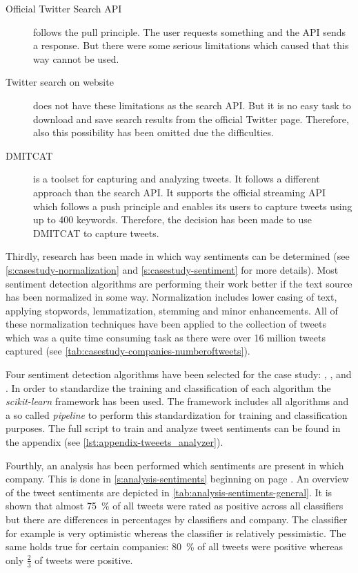 \begin{description}
    \item[Official Twitter Search \ac{API}]
        follows the pull principle. 
        The user requests something and the \ac{API} sends a response.
        But there were some serious limitations which caused that this way cannot be used.

    \item[Twitter search on website]
        does not have these limitations as the search \ac{API}.
        But it is no easy task to download and save search results from the official Twitter page.
        Therefore, also this possibility has been omitted due the difficulties.    
    
    \item[\ac{DMITCAT}] 
        is a toolset for capturing and analyzing tweets.
        It follows a different approach than the search \ac{API}.
        It supports the official streaming \ac{API} which follows a push principle and enables its users to capture tweets using up to 400 keywords.
        Therefore, the decision has been made to use \ac{DMITCAT} to capture tweets.

\end{description}

Thirdly, research has been made in which way sentiments can be determined (see \cref{s:casestudy-normalization} and \cref{s:casestudy-sentiment} for more details).
Most sentiment detection algorithms are performing their work better if the text source has been normalized in some way.
Normalization includes lower casing of text, applying stopwords, lemmatization, stemming and minor enhancements.
All of these normalization techniques have been applied to the collection of tweets which was a quite time consuming task as there were over 16 million tweets captured (see \cref{tab:casestudy-companies-numberoftweets}).

Four sentiment detection algorithms have been selected for the case study: \tb{}, \nb{}, \me{} and \svm{}.
In order to standardize the training and classification of each algorithm the \emph{scikit-learn} framework has been used.
The framework includes all algorithms and a so called \emph{pipeline} to perform this standardization for training and classification purposes.
The full script to train and analyze tweet sentiments can be found in the appendix (see \cref{lst:appendix-tweeets_analyzer}).

Fourthly, an analysis has been performed which sentiments are present in which company.
This is done in \cref{s:analysis-sentiments} beginning on page \pageref{s:analysis-sentiments}.
An overview of the tweet sentiments are depicted in \cref{tab:analysis-sentiments-general}.
It is shown that almost \SI{75}{\percent} of all tweets were rated as positive across all classifiers but there are differences in percentages by classifiers and company.
The \tb{} classifier for example is very optimistic whereas the \nb{} classifier is relatively pessimistic.
The same holds true for certain companies: \SI{80}{\percent} of all \gm{} tweets were positive whereas only $\frac{2}{3}$ of \vw{} tweets were positive.

